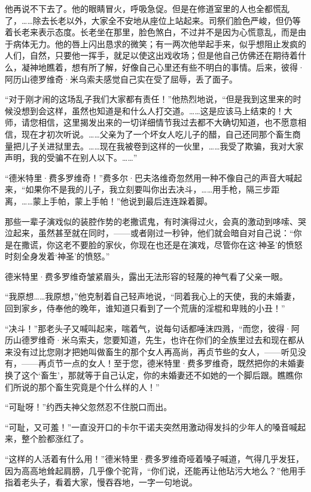 \par 他再说不下去了。他的眼睛冒火，呼吸急促。但是在修道室里的人也全都慌乱了，……除去长老以外，大家全不安地从座位上站起来。司祭们脸色严峻，但仍等着长老来表示态度。长老坐在那里，脸色煞白，不过并不是因为心慌意乱，而是由于病体无力。他的唇上闪出恳求的微笑；有一两次他举起手来，似乎想阻止发疯的人们，自然，只要他一挥手，就足以使这出戏收场；但是他自己仿佛还在期待着什么，凝神地瞧着，想有所了解，好像自己心里还有些不明白的事情。后来，彼得·阿历山德罗维奇·米乌索夫感觉自己实在受了屈辱，丢了面子。
\par “对于刚才闹的这场乱子我们大家都有责任！”他热烈地说，“但是我到这里来的时候没想到会这样，虽然也知道是和什么人打交道。……这是应该马上结束的！大师，请您相信，这里揭发出来的一切详细情节我过去都不大确切知道，也不愿意相信，现在才初次听说。……父亲为了一个坏女人吃儿子的醋，自己还同那个畜生商量把儿子关进狱里去。……现在我被卷到这样的一伙里，……我受了欺骗，我对大家声明，我的受骗不在别人以下。……”
\par “德米特里·费多罗维奇！”费多尔·巴夫洛维奇忽然用一种不像自己的声音大喊起来，“如果你不是我的儿子，我立刻要叫你出去决斗，……用手枪，隔三步距离，……蒙上手帕，蒙上手帕！”他说到最后连连跺着脚。
\par 那些一辈子演戏似的装腔作势的老撒谎鬼，有时演得过火，会真的激动到哆嗦、哭泣起来，虽然甚至就在同时，——或者刚过一秒钟，他们就会暗自对自己说：“你是在撒谎，你这老不要脸的家伙，你现在也还是在演戏，尽管你在这‘神圣’的愤怒时刻全身发着‘神圣’的愤怒。”
\par 德米特里·费多罗维奇皱紧眉头，露出无法形容的轻蔑的神气看了父亲一眼。
\par “我原想……我原想，”他克制着自己轻声地说，“同着我心上的天使，我的未婚妻，回到家乡，侍奉他的晚年，谁知道只看到了一个荒唐的淫棍和卑贱的小丑！”
\par “决斗！”那老头子又喊叫起来，喘着气，说每句话都唾沫四溅，“而您，彼得·阿历山德罗维奇·米乌索夫，您要知道，先生，也许在你们的全族里过去和现在都从来没有过比您刚才把她叫做畜生的那个女人再高尚，再贞节些的女人，——听见没有，——再贞节一点的女人！至于您，德米特里·费多罗维奇，既然把你的未婚妻换了这个‘畜生’，那就等于自己认定，你的未婚妻还不如她的一个脚后跟。瞧瞧你们所说的那个畜生究竟是个什么样的人！”
\par “可耻呀！”约西夫神父忽然忍不住脱口而出。
\par “可耻，又可羞！”一直没开口的卡尔干诺夫突然用激动得发抖的少年人的嗓音喊起来，整个脸都涨红了。
\par “这样的人活着有什么用！”德米特里·费多罗维奇哑着嗓子喊道，气得几乎发狂，因为高高地耸起肩膀，几乎像个驼背，“你们说，还能再让他玷污大地么？”他用手指着老头子，看着大家，慢吞吞地，一字一句地说。
